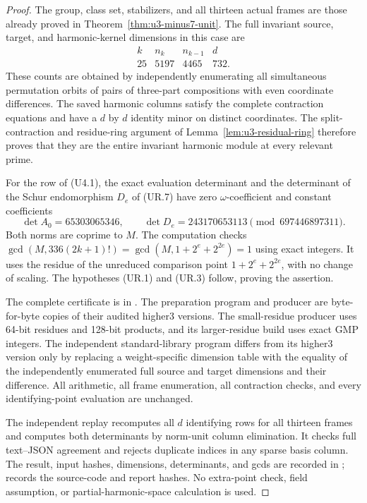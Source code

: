 \begin{proof}
The group, class set, stabilizers, and all thirteen actual frames
are those already proved in Theorem~\ref{thm:u3-minus7-unit}.
The full invariant source, target, and harmonic-kernel dimensions
in this case are
\[
 \begin{array}{c|r|r|r}
 k&n_k&n_{k-1}&d\\ \hline
 25&5197&4465&732.
 \end{array}
 \tag{U4.2}
\]
These counts are obtained by independently enumerating all
simultaneous permutation orbits of pairs of three-part
compositions with even coordinate differences. The saved
harmonic columns satisfy the complete contraction equations
and have a $d$ by $d$ identity minor on distinct coordinates.
The split-contraction and residue-ring argument of
Lemma~\ref{lem:u3-residual-ring} therefore proves that they are
the entire invariant harmonic module at every relevant prime.

For the row of (U4.1), the exact evaluation determinant and
the determinant of the Schur endomorphism $D_e$ of (UR.7)
have zero $\omega$-coefficient and constant coefficients
\[
 \det A_0=65303065346,\qquad
 \det D_e=243170653113\pmod {697446897311}.
 \tag{U4.3}
\]
Both norms are coprime to $M$. The computation checks
$\gcd(M,336(2k+1)!)=\gcd(M,1+2^e+2^{2e})=1$
using exact integers. It uses the residue of the unreduced
comparison point $1+2^e+2^{2e}$, with no change of scaling.
The hypotheses (UR.1) and (UR.3) follow, proving the assertion.

The complete certificate is in
. The preparation program
 and producer
 are byte-for-byte copies
of their audited higher3 versions. The small-residue producer
uses 64-bit residues and 128-bit products, and its larger-residue
build uses exact GMP integers. The independent standard-library
program  differs from its higher3
version only by replacing a weight-specific dimension table
with the equality of the independently enumerated full source
and target dimensions and their difference. All arithmetic,
all frame enumeration, all contraction checks, and every
identifying-point evaluation are unchanged.

The independent replay recomputes all $d$ identifying rows
for all thirteen frames and computes both determinants by
norm-unit column elimination. It checks full text--JSON
agreement and rejects duplicate indices in any sparse basis
column. The result, input hashes, dimensions, determinants,
and gcds are recorded in
;
 records the source-code and
report hashes. No extra-point check, field assumption, or
partial-harmonic-space calculation is used.
\end{proof}
